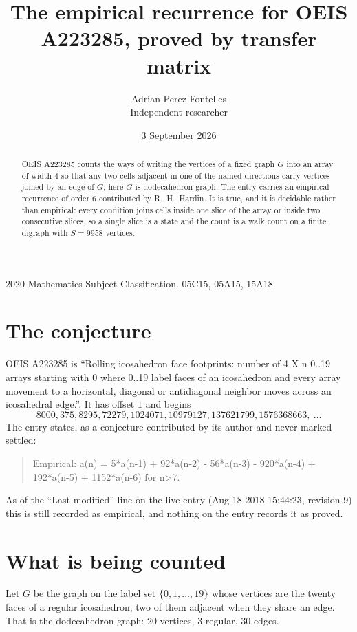 \documentclass[11pt,a4paper]{article}
\title{The empirical recurrence for OEIS A223285, proved by transfer matrix}
\author{Adrian Perez Fontelles\\ \small Independent researcher}
\date{3 September 2026}
\theoremstyle{plain}
\theoremstyle{definition}
\begin{document}
\maketitle

\begin{abstract}
OEIS A223285 counts the ways of writing the vertices of a fixed graph $G$ into an array of width
$4$ so that any two cells adjacent in one of the named directions carry vertices joined by an
edge of $G$; here $G$ is dodecahedron graph. The entry carries an empirical recurrence of order $6$
contributed by R.~H.~Hardin. It is true, and it is decidable rather than empirical: every
condition joins cells inside one slice of the array or inside two consecutive slices, so a
single slice is a state and the count is a walk count on a finite digraph with $S=9958$ vertices.
\end{abstract}

\noindent\small 2020 Mathematics Subject Classification. 05C15, 05A15, 15A18.\normalsize

\section{The conjecture}

OEIS A223285 is ``Rolling icosahedron face footprints: number of 4 X n 0..19 arrays starting with 0 where 0..19 label faces of an icosahedron and every array movement to a horizontal, diagonal or antidiagonal neighbor moves across an icosahedral edge.''. It has offset $1$ and begins
\[
8000, 375, 8295, 72279, 1024071, 10979127, 137621799, 1576368663,\ \dots
\]
The entry states, as a conjecture contributed by its author and never marked settled:
\begin{quote}
Empirical: a(n) = 5*a(n-1) + 92*a(n-2) - 56*a(n-3) - 920*a(n-4) + 192*a(n-5) + 1152*a(n-6) for n>7.
\end{quote}
As of the ``Last modified'' line on the live entry (Aug 18 2018 15:44:23, revision 9) this is still
recorded as empirical, and nothing on the entry records it as proved.

\section{What is being counted}

Let $G$ be the graph on the label set $\{0,1,\dots,19\}$ whose vertices are the twenty faces of a regular icosahedron, two of them adjacent when they share an edge. That is the dodecahedron graph: $20$ vertices, $3$-regular, $30$ edges.
\end{document}
